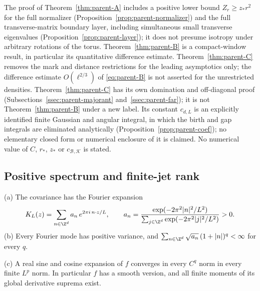 \begin{remark}\label{rem:parent-scopeABC}
The proof of Theorem~\ref{thm:parent-A} includes a positive lower bound $Z_r\ge z_*r^2$ for the full normalizer (Proposition~\ref{prop:parent-normalizer}) and the full transverse-matrix boundary layer, including simultaneous small transverse eigenvalues (Proposition~\ref{prop:parent-layer}); it does not presume isotropy under arbitrary rotations of the torus. Theorem~\ref{thm:parent-B} is a compact-window result, in particular its quantitative difference estimate. Theorem~\ref{thm:parent-C} removes the mark and distance restrictions for the leading asymptotics only; the difference estimate $O(\ell^{2/3})$ of \eqref{eq:parent-B} is not asserted for the unrestricted densities. Theorem~\ref{thm:parent-C} has its own domination and off-diagonal proof (Subsections~\ref{ssec:parent-majorant} and~\ref{ssec:parent-far}); it is not Theorem~\ref{thm:parent-B} under a new label. Its constant $c_{d,L}$ is an explicitly identified finite Gaussian and angular integral, in which the birth and gap integrals are eliminated analytically (Proposition~\ref{prop:parent-coef}); no elementary closed form or numerical enclosure of it is claimed. No numerical value of $C$, $r_*$, $z_*$ or $c_{\mathcal B,\mathcal K}$ is stated.
\end{remark}

\subsection{Positive spectrum and finite-jet rank}\label{ssec:parent-spectrum}

\begin{lemma}\label{lem:parent-spectrum}
\textup{(a)} The covariance has the Fourier expansion
\begin{equation}\label{eq:parent-an}
K_L(z)=\sum_{n\in\Z^d}a_n\,e^{2\pi i\,n\cdot z/L},\qquad a_n=\frac{\exp(-2\pi^2|n|^2/L^2)}{\sum_{j\in\Z^d}\exp(-2\pi^2|j|^2/L^2)}>0 .
\end{equation}
\textup{(b)} Every Fourier mode has positive variance, and $\sum_{n\in\Z^d}\sqrt{a_n}\,(1+|n|)^q<\infty$ for every $q$.

\textup{(c)} A real sine and cosine expansion of $f$ converges in every $C^q$ norm in every finite $L^p$ norm. In particular $f$ has a smooth version, and all finite moments of its global derivative suprema exist.
\end{lemma}

